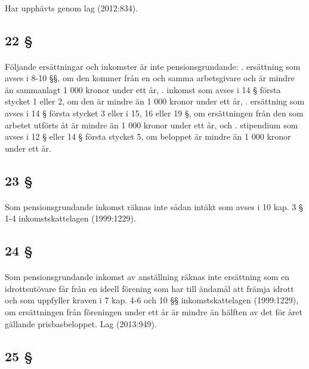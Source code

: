 \documentclass[a4paper,notitlepage,openany,10pt]{book}
\begin{document}
\paragraph*{}
Har upphävts genom
lag (2012:834).
\subsection*{22 §}
\paragraph*{}
Följande ersättningar och inkomster är inte pensionsgrundande:
. ersättning som avses i 8-10 §§, om den kommer från en och samma arbetsgivare och är mindre än sammanlagt 1 000 kronor under ett år,
. inkomst som avses i 14 § första stycket 1 eller 2, om den är mindre än 1 000 kronor under ett år,
. ersättning som avses i 14 § första stycket 3 eller i 15, 16 eller 19 §, om ersättningen från den som arbetet utförts åt är mindre än 1 000 kronor under ett år, och
. stipendium som avses i 12 § eller 14 § första stycket 5, om beloppet är mindre än 1 000 kronor under ett år.
\subsection*{23 §}
\paragraph*{}
Som pensionsgrundande inkomst räknas inte sådan intäkt som avses i 10 kap. 3 § 1-4 inkomstskattelagen (1999:1229).
\subsection*{24 §}
\paragraph*{}
Som pensionsgrundande inkomst av anställning räknas inte ersättning som en idrottsutövare får från en ideell förening som har till ändamål att främja idrott och som uppfyller kraven i 7 kap. 4-6 och 10 §§ inkomstskattelagen (1999:1229), om ersättningen från föreningen under ett år är mindre än hälften av det för året gällande prisbasbeloppet.
Lag (2013:949).
\subsection*{25 §}
\end{document}

